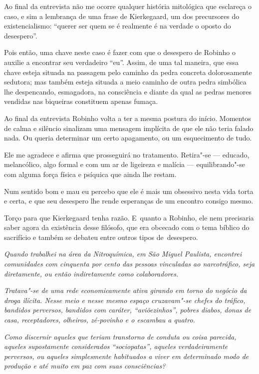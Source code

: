 \asterisc{}

Ao final da entrevista não me ocorre qualquer história mitológica que
esclareça o caso, e sim a lembrança de uma frase de Kierkegaard, um dos
precursores do existencialismo: ``querer ser quem se é realmente é na
verdade o oposto do desespero''.

Pois então, uma chave neste caso é fazer com que o desespero de Robinho
o auxilie a encontrar seu verdadeiro ``eu''. Assim, de uma tal maneira,
que essa chave esteja situada na passagem pelo caminho da pedra concreta
dolorosamente sedutora; mas também esteja situada a meio caminho de
outra pedra simbólica lhe despencando, esmagadora, na consciência e
diante da qual as pedras menores vendidas nas biqueiras constituem
apenas fumaça.

Ao final da entrevista Robinho volta a ter a mesma postura do início.
Momentos de calma e silêncio sinalizam uma mensagem implícita de que ele
não teria falado nada. Ou queria determinar um certo apagamento, ou um
esquecimento de tudo.

Ele me agradece e afirma que prosseguirá no tratamento. Retira"-se ---
educado, melancólico, algo formal e com um ar de ligeireza e malícia ---
equilibrando"-se com alguma força física e psíquica que ainda lhe restam.

Num sentido bom e mau eu percebo que ele é mais um obsessivo nesta vida
torta e certa, e que seu desespero lhe rende esperanças de um encontro
consigo mesmo.

Torço para que Kierkegaard tenha razão. E~quanto a Robinho, ele nem
precisaria saber agora da existência desse filósofo, que era obcecado
com o tema bíblico do sacrifício e também se debateu entre outros tipos
de~desespero.

\asterisc{}
\begingroup\small

\emph{Quando trabalhei na área da Nitroquímica, em
São Miguel Paulista, encontrei comunidades com cinquenta por cento das
pessoas vinculadas ao narcotráfico, seja diretamente, ou então
indiretamente como colaboradores.}

\emph{Tratava"-se de uma rede economicamente ativa girando em torno do
negócio da droga ilícita. Nesse meio e nesse mesmo espaço cruzavam"-se
chefes do tráfico, bandidos perversos, bandidos com caráter,
``aviõezinhos'', pobres diabos, donas de casa, receptadores, olheiros,
zé-povinho e o escambau a quatro.}

\emph{Como discernir aqueles que teriam transtorno
de conduta ou coisa parecida, aqueles supostamente considerados
``sociopatas'', aqueles verdadeiramente perversos, ou aqueles
simplesmente habituados a viver em determinado modo de produção e até
muito em paz com suas consciências?}


